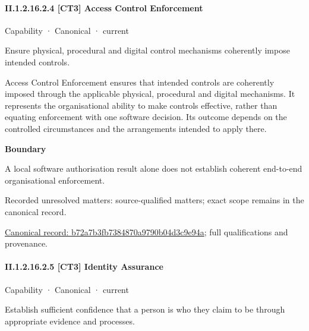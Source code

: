\paragraph*{II.1.2.16.2.4 [CT3] Access Control Enforcement}
\label{navigation:II.1.2.16.2.4}

\label{element:b72a7b3fb7384870a9790b04d3c9e94a}
{\small Capability · Canonical · current}\par

Ensure physical, procedural and digital control mechanisms coherently impose intended controls.



Access Control Enforcement ensures that intended controls are coherently imposed through the applicable physical, procedural and digital mechanisms. It represents the organisational ability to make controls effective, rather than equating enforcement with one software decision. Its outcome depends on the controlled circumstances and the arrangements intended to apply there.



\textbf{Boundary}



A local software authorisation result alone does not establish coherent end-to-end organisational enforcement.


{\small Recorded unresolved matters: source-qualified matters; exact scope remains in the canonical record.}\par
{\footnotesize \href{../../../../continuum/strategy/capability/b72a7b3fb7384870a9790b04d3c9e94a.md}{Canonical record: b72a7b3fb7384870a9790b04d3c9e94a}; full qualifications and provenance.}\par
\paragraph*{II.1.2.16.2.5 [CT3] Identity Assurance}
\label{navigation:II.1.2.16.2.5}

\label{element:56ccd6d3bf5b4ec980a333dfadf8d9fa}
{\small Capability · Canonical · current}\par

Establish sufficient confidence that a person is who they claim to be through appropriate evidence and processes.



